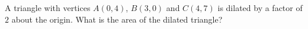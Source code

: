 A triangle with vertices $A(0,4)$, $B(3,0)$ and $C(4,7)$ is dilated by a factor of $2$ about the origin. What is the area of the dilated triangle?
